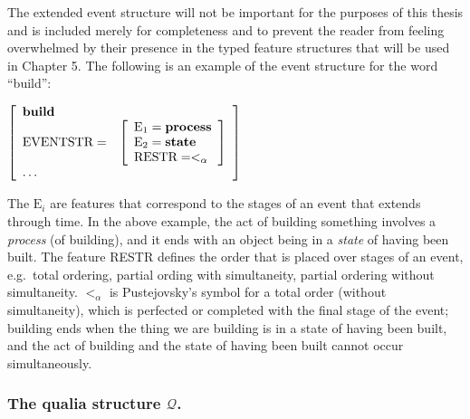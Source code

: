 The extended event structure will not be important for the purposes of this thesis and is included merely for completeness and to prevent the reader from feeling overwhelmed by their presence in the typed feature structures that will be used in Chapter 5. The following is an example of the event structure for the word ``build'':
\par\vspace{5mm}
$\left[
\begin{array}{l l}
\textbf{build} & \\
\text{EVENTSTR} = & \left[ \begin{array}{l}
				\text{E}_1=\textbf{process} \\
				\text{E}_2=\textbf{state} \\
				\text{RESTR}=<_\alpha
				\end{array}\right] \\
\mathellipsis &
\end{array}
\right]$
\par\vspace{5mm}
\noindent The $\text{E}_i$ are features that correspond to the stages of an event that extends through time. In the above example, the act of building something involves a \emph{process} (of building), and it ends with an object being in a \emph{state} of having been built. The feature RESTR defines the order that is placed over stages of an event, e.g.\ total ordering, partial ording with simultaneity, partial ordering without simultaneity. $<_\alpha$ is Pustejovsky's symbol for a total order (without simultaneity), which is perfected or completed with the final stage of the event; building ends when the thing we are building is in a state of having been built, and the act of building and the state of having been built cannot occur simultaneously.

\subsubsection{The qualia structure $\mathcal{Q}$.}


